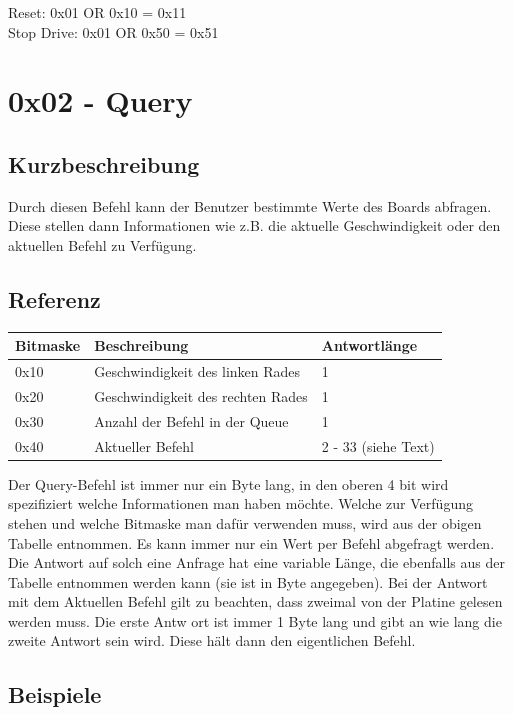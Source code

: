 \documentclass[a4paper]{article}
\begin{document}
	Reset: 0x01 OR 0x10 = 0x11\\
	Stop Drive: 0x01 OR 0x50 = 0x51
	\pagebreak

	\section{0x02 - Query}

	\subsection{Kurzbeschreibung}

	Durch diesen Befehl kann der Benutzer bestimmte Werte des Boards abfragen. Diese stellen dann Informationen
	wie z.B. die aktuelle Geschwindigkeit oder den aktuellen Befehl zu Verfügung.

	\subsection{Referenz}

	\begin{tabularx}{\linewidth}{|l|l|X|}
		\hline
		\textbf{Bitmaske} & \textbf{Beschreibung} & \textbf{Antwortlänge} \\
		\hline
		\hline
		0x10 				& Geschwindigkeit des linken Rades & 1 \\
		\hline
		0x20				& Geschwindigkeit des rechten Rades & 1 \\
		\hline
		0x30				& Anzahl der Befehl in der Queue & 1 \\
		\hline
		0x40				& Aktueller Befehl & 2 - 33 (siehe Text) \\
		\hline
	\end{tabularx}
	
	Der Query-Befehl ist immer nur ein Byte lang, in den oberen 4 bit wird spezifiziert welche Informationen man haben möchte.
	Welche zur Verfügung stehen und welche Bitmaske man dafür verwenden muss, wird aus der obigen Tabelle entnommen. Es kann immer
	nur ein Wert per Befehl abgefragt werden. Die Antwort auf solch eine Anfrage hat eine variable Länge, die ebenfalls aus
	der Tabelle entnommen werden kann (sie ist in Byte angegeben).
	Bei der Antwort mit dem Aktuellen Befehl gilt zu beachten, dass zweimal von der Platine gelesen werden muss. Die erste
	Antw
	ort ist immer 1 Byte lang und gibt an wie lang die zweite Antwort sein wird. Diese hält dann den eigentlichen Befehl.
	\subsection{Beispiele}
\end{document}
